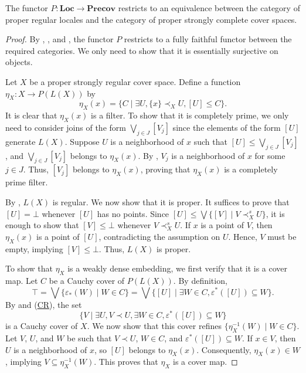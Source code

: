 \documentclass[reqno]{amsart}
\newcommand{\axref}[1]{(\hyperref[ax:#1]{#1})}
\theoremstyle{definition}
\theoremstyle{remark}
\numberwithin{figure}{section}
\newcommand{\rb}{\prec}
\newcommand{\cat}[1]{\mathbf{#1}}
\begin{document}
\begin{thm}
The functor $P : \cat{Loc} \to \cat{Precov}$ restricts to an equivalence between the category of proper regular locales and the category of proper strongly complete cover spaces.
\end{thm}
\begin{proof}
By , , and , the functor $P$ restricts to a fully faithful functor between the required categories.
We only need to show that it is essentially surjective on objects.

Let $X$ be a proper strongly regular cover space.
Define a function $\eta_X : X \to P(L(X))$ by
\[ \eta_X(x) = \{ C \mid \exists U, \{ x \} \rb_X U, [U] \leq C \}. \]
It is clear that $\eta_X(x)$ is a filter.
To show that it is completely prime, we only need to consider joins of the form $\bigvee_{j \in J} [V_j]$ since the elements of the form $[U]$ generate $L(X)$.
Suppose $U$ is a neighborhood of $x$ such that $[U] \leq \bigvee_{j \in J} [V_j]$, and $\bigvee_{j \in J} [V_j]$ belongs to $\eta_X(x)$.
By , $V_j$ is a neighborhood of $x$ for some $j \in J$.
Thus, $[V_j]$ belongs to $\eta_X(x)$, proving that $\eta_X(x)$ is a completely prime filter.

By , $L(X)$ is regular.
We now show that it is proper.
It suffices to prove that $[U] = \bot$ whenever $[U]$ has no points.
Since $[U] \leq \bigvee \{ [V] \mid V \rb^s_X U \}$, it is enough to show that $[V] \leq \bot$ whenever $V \rb^s_X U$.
If $x$ is a point of $V$, then $\eta_X(x)$ is a point of $[U]$, contradicting the assumption on $U$.
Hence, $V$ must be empty, implying $[V] \leq \bot$.
Thus, $L(X)$ is proper.

To show that $\eta_X$ is a weakly dense embedding, we first verify that it is a cover map.
Let $C$ be a Cauchy cover of $P(L(X))$.
By definition, 
\[
\top = \bigvee \{ \varepsilon_*(W) \mid W \in C \} = \bigvee \{ [U] \mid \exists W \in C, \varepsilon^*([U]) \subseteq W \}.
\]
By  and \axref{CR}, the set 
\[
\{ V \mid \exists U, V \rb U, \exists W \in C, \varepsilon^*([U]) \subseteq W \}
\]
is a Cauchy cover of $X$.
We now show that this cover refines $\{ \eta_X^{-1}(W) \mid W \in C \}$.
Let $V$, $U$, and $W$ be such that $V \rb U$, $W \in C$, and $\varepsilon^*([U]) \subseteq W$.
If $x \in V$, then $U$ is a neighborhood of $x$, so $[U]$ belongs to $\eta_X(x)$.
Consequently, $\eta_X(x) \in W$, implying $V \subseteq \eta_X^{-1}(W)$.
This proves that $\eta_X$ is a cover map.


\end{proof}
\end{document}
